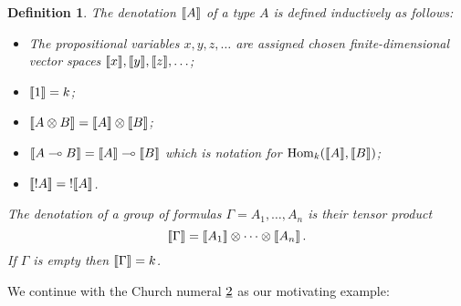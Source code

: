 \documentclass[english,letter paper,12pt,reqno]{article}
\theoremstyle{example}
\newtheorem{definition}[theorem]{Definition}
\numberwithin{equation}{section}
\def\Hom{\operatorname{Hom}}
\begin{document}
\begin{definition}\label{defn:denotation_objects} The \emph{denotation} $\llbracket A \rrbracket$ of a type $A$ is defined inductively as follows:
\begin{itemize}
\item The propositional variables $x, y, z, \ldots$ are assigned chosen finite-dimensional vector spaces $\llbracket x \rrbracket, \llbracket y \rrbracket, \llbracket z \rrbracket, \ldots$;
\item $\llbracket 1 \rrbracket = k$;
\item $\llbracket A \otimes B \rrbracket = \llbracket A \rrbracket \otimes \llbracket B \rrbracket$;
\item $\llbracket A \multimap B \rrbracket = \llbracket A \rrbracket \multimap \llbracket B \rrbracket$ which is notation for $\Hom_k(\den{A}, \den{B})$;
\item $\llbracket !A \rrbracket = {!} \llbracket A \rrbracket$.
\end{itemize}
The denotation of a group of formulas $\Gamma = A_1,\ldots,A_n$ is their tensor product
\[
\llbracket \Gamma \rrbracket = \llbracket A_1 \rrbracket \otimes \cdots \otimes \llbracket A_n \rrbracket\,.
\]
If $\Gamma$ is empty then $\llbracket \Gamma \rrbracket = k$.
\end{definition}

We continue with the Church numeral $\underline{2}$ as our motivating example:
\end{document}
